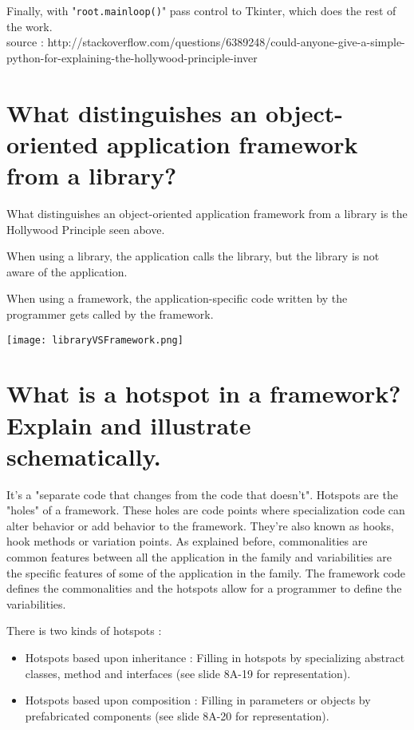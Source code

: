 Finally, with "\texttt{root.mainloop()}" pass control to Tkinter, which does the rest of the work.\\

source : http://stackoverflow.com/questions/6389248/could-anyone-give-a-simple-python-for-explaining-the-hollywood-principle-inver
\section{What distinguishes an object-oriented application framework from a library?}
What distinguishes an object-oriented application framework from a library is the Hollywood Principle seen above.

When using a library, the application calls the library, but the library is not aware of the application.

When using a framework, the application-specific code written by the programmer gets called by the framework.

\begin{center}
\texttt{[image: libraryVSFramework.png]}
\end{center}

\section{What is a hotspot in a framework? Explain and illustrate schematically.}
It's a "separate code that changes from the code that doesn't". Hotspots are the "holes" of a framework. These holes are code points where specialization code can alter behavior or add behavior to the framework. They're also known as hooks, hook methods or variation points.
As explained before, commonalities are common features between all the application in the family and variabilities are the specific features of some of the application in the family. The framework code defines the commonalities and the hotspots allow for a programmer to define the variabilities.

There is two kinds of hotspots : 
\begin{itemize}
\item Hotspots based upon inheritance : Filling in hotspots by specializing abstract  classes, method and interfaces (see slide 8A-19 for representation).
\item Hotspots based upon composition : Filling in parameters or objects by prefabricated components (see slide 8A-20 for representation).
\end{itemize}

